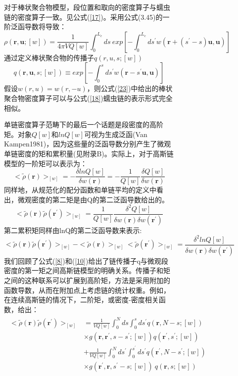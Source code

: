 \begin{figure}[H]
\begin{figure}[ht]
对于棒状聚合物模型，段位置和取向的密度算子与蠕虫链的密度算子一致。见公式(\ref{17})。采用公式(3.45)的一阶泛函导数将导致：
\begin{equation}\label{23}
\rho(\mathbf{r},\mathbf{u};[w])=\frac{1}{4\pi VQ[w]}\int_{0}^{L_c}ds~exp[-\int_{0}^{L_c}ds^{'}w (\mathbf{r}+(s^{'}-s)\mathbf{u},\mathbf{u})]
\end{equation}
通过定义棒状聚合物的传播子$q(r,u,s;[w])$
\begin{equation}\label{24}
q(\mathbf{r},\mathbf{u},s;[w])\equiv exp[-\int_{0}^{s}ds^{'}w(\mathbf{r}-s^{'}\mathbf{u},\mathbf{u})]
\end{equation}
假设$w(r,u)=w(r,-u)$，则公式(\ref{23})中给出的棒状聚合物密度算子可以与公式(\ref{18})蠕虫链的表示形式完全相似。

单链密度算子范畴下的最后一个话题是段密度的高阶矩。对象$Q[w]$和$ln Q[w]$可视为生成泛函(Van Kampen1981)，因为这些量的泛函导数分别产生了微观单链密度的矩和累积量(见附录B)。实际上，对于高斯链模型的一阶矩可以表示为：
\begin{equation}\label{25}
<\tilde{\rho}(\mathbf{r})>_{[w]}=-\frac{\delta lnQ[w]}{\delta w(\mathbf{r})}=-\frac{1}{Q[w]}\frac{\delta Q[w]}{\delta w(\mathbf{r})}
\end{equation}
同样地，从规范化的配分函数和单链平均的定义中看出，微观密度的第二矩是由Q的第二泛函导数给出的。
\begin{equation}\label{26}
<\tilde{\rho}(\mathbf{r})\tilde{\rho}(\mathbf{r}^{'})>_{[w]}=\frac{1}{Q[w]}\frac{\delta^2 Q[w]}{\delta w(\mathbf{r})\delta  w(\mathbf{r}^{'})}
\end{equation}
第二累积矩同样由lnQ的第二泛函导数来表示:
\begin{equation}\label{27}
<\tilde{\rho}(\mathbf{r})\tilde{\rho}(\mathbf{r}^{'})>_{[w]}-<\tilde{\rho}(\mathbf{r})>_{[w]}<\tilde{\rho}(\mathbf{r}^{'})>_{[w]}=\frac{\delta^2 lnQ[w]}{\delta w(\mathbf{r})\delta w(\mathbf{r}^{'})}
\end{equation}
我们回顾了公式(\ref{8})和(\ref{10})给出了链传播子q与微观段密度的第一矩之间高斯链模型的明确关系。传播子和矩之间的这种联系可以扩展到高阶矩，方法是采用附加的函数导数，从而在附加点上考虑链的统计权重。例如，在连续高斯链的情况下，二阶矩，或密度-密度相关函数，给出：
\begin{align}\label{28}
\begin{split}
<\tilde{\rho}(\mathbf{r})\tilde{\rho}(\mathbf{r}^{'})>_{[w]}&=\frac{1}{VQ[w]}\int_{0}^{N}ds \int_{0}^{s}ds^{'}q(\mathbf{r},N-s;[w])\\&\times g(\mathbf{r},\mathbf{r}^{'},s-s^{'};[w])q(\mathbf{r}^{'},s^{'};[w])\\&+\frac{1}{VQ[w]}\int_{0}^{N}ds^{'} \int_{0}^{s^{'}}ds^{'}q(\mathbf{r}^{'},N-s^{'};[w])\\&\times g(\mathbf{r}^{'},\mathbf{r},s^{'}-s;[w])~q(\mathbf{r},s;[w])

\end{split}
\end{align}
\end{figure}
\end{figure}
